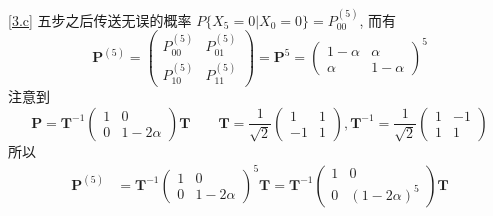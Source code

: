 \documentclass[boxes]{homework}
\begin{document}
\begin{solution}
    \ref{3.c} 五步之后传送无误的概率 $P\{X_5 = 0\vert X_0 = 0\} = P^{(5)}_{00}$, 而有
    \begin{equation}
        \boldsymbol{P}^{(5)}
        = \begin{pmatrix}
            P^{(5)}_{00} & P^{(5)}_{01} \\
            P^{(5)}_{10} & P^{(5)}_{11}
        \end{pmatrix}
        = \boldsymbol{P}^{5}
        = \begin{pmatrix}
            1 - \alpha & \alpha     \\
            \alpha     & 1 - \alpha
        \end{pmatrix}^5
    \end{equation}
    注意到
    \begin{equation}
        \boldsymbol{P}
        = \boldsymbol{T}^{-1} \begin{pmatrix}
            1 & 0           \\
            0 & 1 - 2\alpha
        \end{pmatrix} \boldsymbol{T}
        \qquad
        \boldsymbol{T}
        = \frac{1}{\sqrt{2}} \begin{pmatrix}
            1  & 1 \\
            -1 & 1
        \end{pmatrix},
        \boldsymbol{T}^{-1}
        = \frac{1}{\sqrt{2}} \begin{pmatrix}
            1 & -1 \\
            1 & 1
        \end{pmatrix}
    \end{equation}
    所以
    \begin{equation}
        \begin{aligned}
            \boldsymbol{P}^{(5)}
             & = \boldsymbol{T}^{-1} \begin{pmatrix}
                                         1 & 0           \\
                                         0 & 1 - 2\alpha
                                     \end{pmatrix}^5 \boldsymbol{T}
            = \boldsymbol{T}^{-1} \begin{pmatrix}
                                      1 & 0               \\
                                      0 & (1 - 2\alpha)^5
                                  \end{pmatrix} \boldsymbol{T}         \\

\end{aligned}
\end{equation}
\end{solution}
\end{document}
